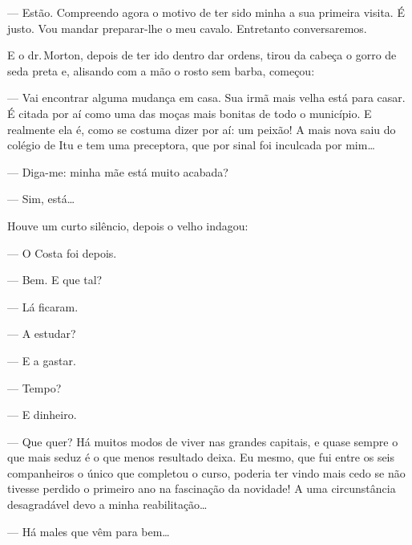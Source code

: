 --- Estão. Compreendo agora o motivo de ter sido minha a sua primeira
visita. É justo. Vou mandar preparar-lhe o meu cavalo. Entretanto
conversaremos.

E o dr.\,Morton, depois de ter ido dentro dar ordens, tirou da cabeça o
gorro de seda preta e, alisando com a mão o rosto sem barba, começou:

--- Vai encontrar alguma mudança em casa. Sua irmã mais velha está para
casar. É citada por aí como uma das moças mais bonitas de todo o
município. E realmente ela é, como se costuma dizer por aí: um peixão! A
mais nova saiu do colégio de Itu e tem uma preceptora, que por sinal foi
inculcada por mim\ldots{}

--- Diga-me: minha mãe está muito acabada?



--- Sim, está\ldots{}

Houve um curto silêncio, depois o velho indagou:


--- O Costa foi depois.

--- Bem. E que tal?

--- Lá ficaram.

--- A estudar?

--- E a gastar.

--- Tempo?

--- E dinheiro.


--- Que quer? Há muitos modos de viver nas grandes capitais, e quase
sempre o que mais seduz é o que menos resultado deixa. Eu mesmo, que fui
entre os seis companheiros o único que completou o curso, poderia ter
vindo mais cedo se não tivesse perdido o primeiro ano na fascinação da
novidade! A uma circunstância desagradável devo a minha
reabilitação\ldots{}

--- Há males que vêm para bem\ldots{}

